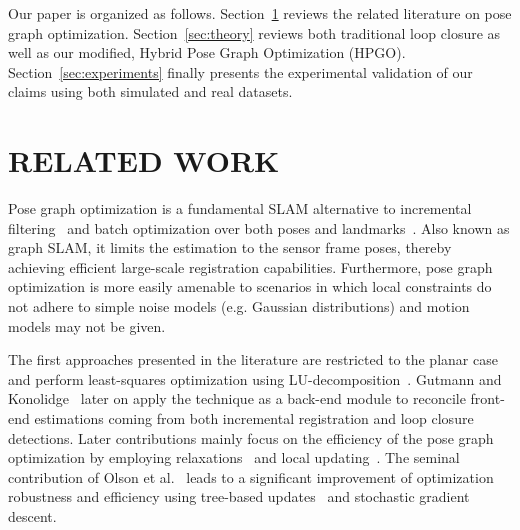 \documentclass[letterpaper, 10 pt, conference]{ieeeconf}  %
\begin{document}
Our paper is organized as follows. Section~\ref{sec:relatedWork} reviews the related literature on pose graph optimization. Section~\ref{sec:theory} reviews both traditional loop closure as well as our modified, Hybrid Pose Graph Optimization (HPGO). Section~\ref{sec:experiments} finally presents the experimental validation of our claims using both simulated and real datasets.

\section{RELATED WORK}
\label{sec:relatedWork}

Pose graph optimization is a fundamental SLAM alternative to incremental filtering~\cite{davison07} and batch optimization over both poses and landmarks~\cite{triggs00}. Also known as graph SLAM, it limits the estimation to the sensor frame poses, thereby achieving efficient large-scale registration capabilities. Furthermore, pose graph optimization is more easily amenable to scenarios in which local constraints do not adhere to simple noise models (e.g. Gaussian distributions) and motion models may not be given.

The first approaches presented in the literature are restricted to the planar case and perform least-squares optimization using LU-decomposition~\cite{lu97}. Gutmann and Konolidge~\cite{gutmann99} later on apply the technique as a back-end module to reconcile front-end estimations coming from both incremental registration and loop closure detections. Later contributions mainly focus on the efficiency of the pose graph optimization by employing relaxations~\cite{howard01,duckett02,frese05} and local updating~\cite{howard01,duckett02,frese05,olson06}. The seminal contribution of Olson et al.~\cite{olson06} leads to a significant improvement of optimization robustness and efficiency using tree-based updates~\cite{frese06} and stochastic gradient descent.
\end{document}
